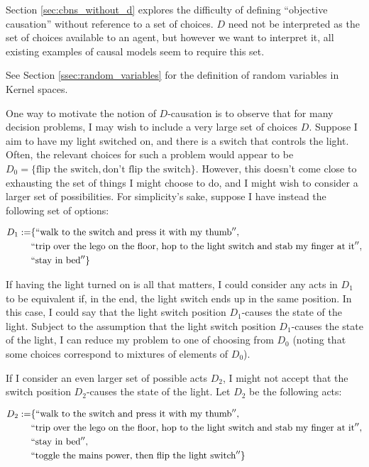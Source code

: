 Section \ref{sec:cbns_without_d} explores the difficulty of defining ``objective causation'' without reference to a set of choices. $D$ need not be interpreted as the set of choices available to an agent, but however we want to interpret it, all existing examples of causal models seem to require this set.

See Section \ref{ssec:random_variables} for the definition of random variables in Kernel spaces.

One way to motivate the notion of $D$-causation is to observe that for many decision problems, I may wish to include a very large set of choices $D$. Suppose I aim to have my light switched on, and there is a switch that controls the light. Often, the relevant choices for such a problem would appear to be $D_0=\{\text{flip the switch},\text{don't flip the switch}\}$. However, this doesn't come close to exhausting the set of things I might choose to do, and I might wish to consider a larger set of possibilities. For simplicity's sake, suppose I have instead the following set of options:

\begin{align*}
D_1:=&\{``\text{walk to the switch and press it with my thumb}'', \\
    &``\text{trip over the lego on the floor, hop to the light switch and stab my finger at it}'',\\
    &``\text{stay in bed}''\}
\end{align*}

If having the light turned on is all that matters, I could consider any acts in $D_1$ to be equivalent if, in the end, the light switch ends up in the same position. In this case, I could say that the light switch position $D_1$-causes the state of the light. Subject to the assumption that the light switch position $D_1$-causes the state of the light, I can reduce my problem to one of choosing from $D_0$ (noting that some choices correspond to mixtures of elements of $D_0$).

If I consider an even larger set of possible acts $D_2$, I might not accept that the switch position $D_2$-causes the state of the light. Let $D_2$ be the following acts:

\begin{align*}
D_2:=&\{``\text{walk to the switch and press it with my thumb}'', \\
    &``\text{trip over the lego on the floor, hop to the light switch and stab my finger at it}'',\\
    &``\text{stay in bed}'',\\
    &``\text{toggle the mains power, then flip the light switch}''\}
\end{align*}

